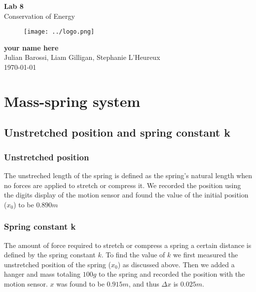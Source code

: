 \documentclass[11pt, letterpaper, includehead]{article}
\begin{document}
\begin{titlepage}
  \begin{center}
    \Huge{\textbf{Lab 8}}\\
    \Huge{Conservation of Energy}
    \vfill
    \begin{figure}[H] %
      \centering 
      \texttt{[image: ../logo.png]}
    \end{figure}
    \large{\textbf{your name here}}\\
    \large{Julian Barossi, Liam Gilligan, Stephanie L'Heureux}\\
    \vspace{0.5cm}
    \normalsize
    \today
  \end{center}
\end{titlepage}

\tableofcontents
\pagebreak %

\pagestyle{fancy}
\fancyhead{}

\section{Mass-spring system} %
\subsection{Unstretched position and spring constant k}
\subsubsection{Unstretched position}
The unstreched length of the spring is defined as the spring's natural length when no forces
are applied to stretch or compress it. We recorded the position using the digits display 
of the motion sensor and found the value of the initial position ($x_0$) to be $0.890m$

\subsubsection{Spring constant k}
The amount of force required to stretch or compress a spring a certain distance is defined by the spring constant $k$.
To find the value of $k$ we first measured the unstretched position of the spring
($x_0$) as discussed above. Then we added a hanger and mass totaling $100g$ to the spring and recorded the position
with the motion sensor. $x$ was found to be $0.915m$, and thus $\Delta x$ is $0.025 m$.\\
\end{document}
